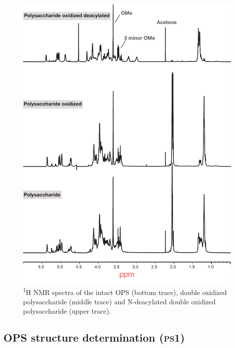 \begin{figure}[ph] %
  \begin{center}
    \includegraphics[height=0.9\textheight]{lps_chapter/img/lpsfig1.pdf}
  \end{center}
  \caption[\textsuperscript{1}H \ac{NMR} spectra of \caulobacter{} \ac{OPS}]{\textsuperscript{1}H
    \ac{NMR} spectra of the intact \caulobacter{} \ac{OPS} (bottom trace), double oxidized
    polysaccharide (middle trace) and N-deacylated double oxidized polysaccharide (upper trace).}
  \label{fig:lpsfig1}
\end{figure}


\subsection{\Acl{OPS} structure determination (\textsc{ps}1)} %
\label{sub:o_antigen_structure_determination_ps1_}

